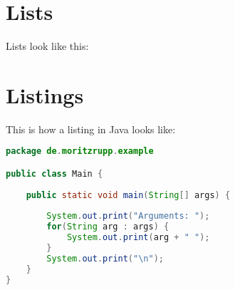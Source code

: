 \section{Lists}
\label{sec:Lists}

Lists look like this:

\blinditemize[5]

\section{Listings}
\label{sec:Listings}

This is how a listing in Java looks like:

\begin{lstlisting}[language=Java, caption={A simple Java listing.}, label={lst:Java}]
package de.moritzrupp.example

public class Main {
	
	public static void main(String[] args) {
	
		System.out.print("Arguments: ");
		for(String arg : args) {
			System.out.print(arg + " ");
		}
		System.out.print("\n");
	}
}
\end{lstlisting}